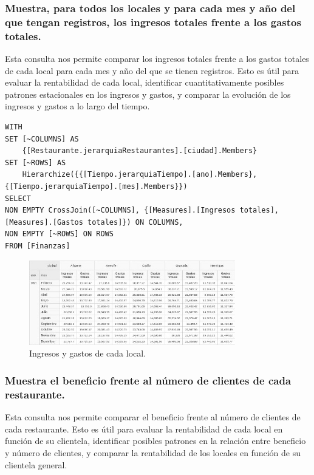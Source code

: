 \documentclass[11pt]{opticajnl}
\begin{document}
\subsubsection{Muestra, para todos los locales y para cada mes y año del que tengan registros, los ingresos totales frente a los gastos totales.}

Esta consulta nos permite comparar los ingresos totales frente a los gastos totales de cada local para cada mes y año del que se tienen registros. Esto es útil para evaluar la rentabilidad de cada local, identificar cuantitativamente posibles patrones estacionales en los ingresos y gastos, y comparar la evolución de los ingresos y gastos a lo largo del tiempo.

\begin{lstlisting}[style=terminal]
WITH
SET [~COLUMNS] AS
    {[Restaurante.jerarquiaRestaurantes].[ciudad].Members}
SET [~ROWS] AS
    Hierarchize({{[Tiempo.jerarquiaTiempo].[ano].Members}, {[Tiempo.jerarquiaTiempo].[mes].Members}})
SELECT
NON EMPTY CrossJoin([~COLUMNS], {[Measures].[Ingresos totales], [Measures].[Gastos totales]}) ON COLUMNS,
NON EMPTY [~ROWS] ON ROWS
FROM [Finanzas]
\end{lstlisting}

\begin{figure}[H]
    \centering
    \includegraphics[width=0.8\textwidth]{fotos/ingresos_gastos.jpg}
    \caption{Ingresos y gastos de cada local.}
    \label{fig:consulta4}
\end{figure}


\subsubsection{Muestra el beneficio frente al número de clientes de cada restaurante.}

Esta consulta nos permite comparar el beneficio frente al número de clientes de cada restaurante. Esto es útil para evaluar la rentabilidad de cada local en función de su clientela, identificar posibles patrones en la relación entre beneficio y número de clientes, y comparar la rentabilidad de los locales en función de su clientela general.
\end{document}
